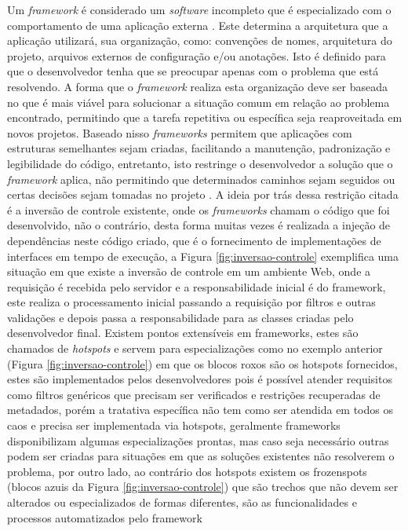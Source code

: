 \par Um \textit{framework} é considerado um \textit{software} incompleto que é especializado com o comportamento de uma aplicação externa \cite{johnson1988designing}. Este determina a arquitetura que a aplicação utilizará, sua organização, como: convenções de nomes, arquitetura do projeto, arquivos externos de configuração e/ou anotações. Isto é definido para que o desenvolvedor tenha que se preocupar apenas com o problema que está resolvendo. A forma que o \textit{framework} realiza esta organização deve ser baseada no que é mais viável para solucionar a situação comum em relação ao problema encontrado, permitindo que a tarefa repetitiva ou específica seja reaproveitada em novos projetos.
Baseado nisso \textit{frameworks} permitem que aplicações com estruturas semelhantes sejam criadas, facilitando a manutenção, padronização e legibilidade do código, entretanto, isto restringe o desenvolvedor a solução que o \textit{framework} aplica, não permitindo que determinados caminhos sejam seguidos ou certas decisões sejam tomadas no projeto \cite{gamma2009padroes}. A ideia por trás dessa restrição citada é a inversão de controle existente, onde os \textit{frameworks} chamam o código que foi desenvolvido, não o contrário, desta forma muitas vezes é realizada a injeção de dependências neste código criado, que é o fornecimento de implementações de interfaces em tempo de execução, a Figura \ref{fig:inversao-controle} exemplifica uma situação em que existe a inversão de controle em um ambiente Web, onde a requisição é recebida pelo servidor e a responsabilidade inicial é do framework, este realiza o processamento inicial passando a requisição por filtros e outras validações e depois passa a responsabilidade para as classes criadas pelo desenvolvedor final. Existem pontos extensíveis em frameworks, estes são chamados de \textit{hotspots} e servem para especializações como no exemplo anterior (Figura \ref{fig:inversao-controle}) em que os blocos roxos são os hotspots fornecidos, estes são implementados pelos desenvolvedores pois é possível atender requisitos como filtros genéricos que precisam ser verificados e restrições recuperadas de metadados, porém a tratativa específica não tem como ser atendida em todos os caos e precisa ser implementada via hotspots, geralmente frameworks disponibilizam algumas especializações prontas, mas caso seja necessário outras podem ser criadas para situações em que as soluções existentes não resolverem o problema, por outro lado, ao contrário dos hotspots existem os frozenspots (blocos azuis da Figura \ref{fig:inversao-controle}) que são trechos que não devem ser alterados ou especializados de formas diferentes, são as funcionalidades e processos automatizados pelo framework \cite{markiewicz2001object}

